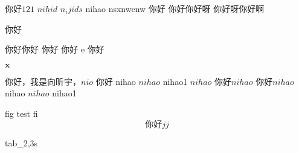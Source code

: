 你好$121$
$nihid$ 
$n_ijids$ nihao
nsxnwcnw
你好
你好你好呀 你好呀你好啊 

你好

你好你好 你好 
你好 e
你好

$\mathbf{x}$

你好，我是向昕宇，$nio $ 你好 nihao $nihao$ nihao1 $nihao$ 你好$nihao$ 你好$nihao$ nihao $nihao$ nihao1

fig test fi
\begin{equation}
  你好 jj
\end{equation}

tab_2,3s

